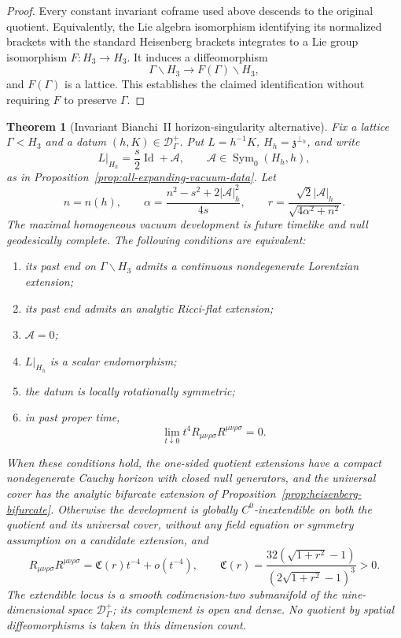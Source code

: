 \documentclass[10pt,a4paper]{article}
\numberwithin{equation}{section}
\newtheorem{theorem}{Theorem}[section]
\theoremstyle{definition}
\theoremstyle{remark}
\begin{document}
\begin{proof}
Every constant invariant coframe used above descends to the original
quotient.  Equivalently, the Lie algebra isomorphism identifying its
normalized brackets with the standard Heisenberg brackets integrates
to a Lie group isomorphism $F:H_3\to H_3$.  It induces a diffeomorphism
\[
 \Gamma\backslash H_3\longrightarrow
 F(\Gamma)\backslash H_3,
\]
and $F(\Gamma)$ is a lattice.  This establishes the claimed
identification without requiring $F$ to preserve $\Gamma$.
\end{proof}

\begin{theorem}[Invariant Bianchi~II horizon-singularity alternative]
\label{thm:vacuum-bianchi-alternative}
\label{cor:open-dense-vacuum-inextendibility}
Fix a lattice $\Gamma<H_3$ and a datum
$(h,K)\in\mathscr D^+_\Gamma$.  Put $L=h^{-1}K$,
$H_h=\mathfrak z^{\perp_h}$, and write
\[
 L|_{H_h}=\frac{s}{2}\operatorname{Id}+\mathcal A,
 \qquad
 \mathcal A\in\operatorname{Sym}_0(H_h,h),
\]
as in Proposition~\ref{prop:all-expanding-vacuum-data}.  Let
\begin{equation}
 n=n(h),\qquad
 \alpha=\frac{n^2-s^2+2|\mathcal A|_h^2}{4s},\qquad
 r=\frac{\sqrt2|\mathcal A|_h}{\sqrt{4\alpha^2+n^2}}.
 \label{eq:invariant-vacuum-anisotropy}
\end{equation}
The maximal homogeneous vacuum development is future timelike and null
geodesically complete.  The following conditions are equivalent:
\begin{enumerate}[label=\textup{(\roman*)}]
\item its past end on $\Gamma\backslash H_3$ admits a continuous
nondegenerate Lorentzian extension;
\item its past end admits an analytic Ricci-flat extension;
\item $\mathcal A=0$;
\item $L|_{H_h}$ is a scalar endomorphism;
\item the datum is locally rotationally symmetric;
\item in past proper time,
\[
 \lim_{t\downarrow0}t^4
 R_{\mu\nu\rho\sigma}R^{\mu\nu\rho\sigma}=0.
\]
\end{enumerate}
When these conditions hold, the one-sided quotient extensions have a
compact nondegenerate Cauchy horizon with closed null generators, and
the universal cover has the analytic bifurcate extension of
Proposition~\ref{prop:heisenberg-bifurcate}.  Otherwise the development
is globally $C^0$-inextendible on both the quotient and its universal
cover, without any field equation or symmetry assumption on a candidate
extension, and
\begin{equation}
 R_{\mu\nu\rho\sigma}R^{\mu\nu\rho\sigma}
 =\mathfrak C(r)t^{-4}+o(t^{-4}),\qquad
 \mathfrak C(r)=
 \frac{32(\sqrt{1+r^2}-1)}{(2\sqrt{1+r^2}-1)^3}>0.
 \label{eq:curvature-residue}
\end{equation}
The extendible locus is a smooth codimension-two submanifold of the
nine-dimensional space $\mathscr D^+_\Gamma$; its complement is open
and dense.  No quotient by spatial diffeomorphisms is taken in this
dimension count.
\end{theorem}
\end{document}
